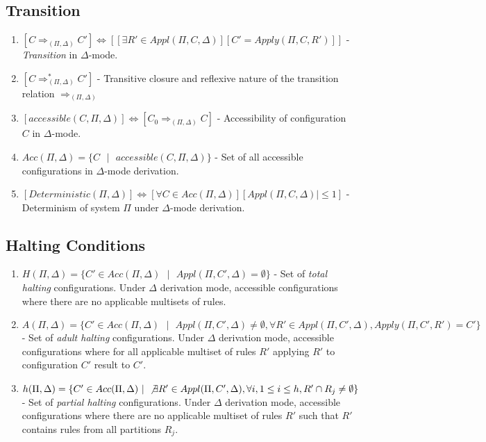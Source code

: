 \documentclass{article}
\newcommand{\s}{\text{ }}
\begin{document}
\subsection{Transition}

\begin{enumerate}
   \item $[C \Rightarrow_{(\Pi, \Delta)} C'] \Leftrightarrow [[\exists R' \in Appl(\Pi,C,\Delta)]
         [C'=Apply(\Pi,C,R')]]$ - \textit{Transition} in $\Delta$-mode.
   \item $[C \Rightarrow_{(\Pi, \Delta)}^{*} C']$ - Transitive closure and reflexive nature of the 
         transition relation $\Rightarrow_{(\Pi,\Delta)}$
   \item $[accessible(C,\Pi, \Delta)] \Leftrightarrow [C_0 \Rightarrow_{(\Pi, \Delta)} C]$ - 
         Accessibility of configuration $C$ in $\Delta$-mode.
   \item $Acc(\Pi, \Delta) = \{C \s | \s accessible(C, \Pi, \Delta)\}$ - Set of all accessible
         configurations in $\Delta$-mode derivation. 
   \item $[Deterministic(\Pi, \Delta)] \Leftrightarrow [\forall C \in Acc(\Pi, \Delta)][Appl(\Pi, C, 
         \Delta)| \leq 1]$ - Determinism of system $\Pi$ under $\Delta$-mode derivation.
\end{enumerate}

\subsection{Halting Conditions} 

\begin{enumerate}
   \item $H(\Pi, \Delta) = \{C' \in Acc(\Pi, \Delta) \s | \s Appl(\Pi, C', \Delta) = \emptyset\}$ -
         Set of \textit{total halting} configurations. Under $\Delta$ derivation mode, accessible 
         configurations where there are no applicable multisets of rules.
   \item $A(\Pi, \Delta) = \{C' \in Acc(\Pi, \Delta) \s | \s Appl(\Pi, C', \Delta) \neq \emptyset, 
         \forall R' \in Appl(\Pi,C',\Delta), Apply(\Pi,C',R')=C' \}$ - Set of \textit{adult halting}
         configurations. Under $\Delta$ derivation mode, accessible configurations where for all 
         applicable multiset of rules $R'$ applying $R'$ to configuration $C'$ result to $C'$.
   \item $h(\Pi, \Delta) = \{C' \in Acc(\Pi, \Delta) \s | \s \not\exists R' \in Appl(\Pi, C', 
         \Delta), \forall i, 1 \leq i \leq h, R' \cap R_j \neq \emptyset \}$ - Set of 
         \textit{partial halting} configurations. Under $\Delta$ derivation mode, accessible 
         configurations where there are no applicable multiset of rules $R'$ such that $R'$
         contains rules from all partitions $R_j$.
\end{enumerate}
\end{document}
